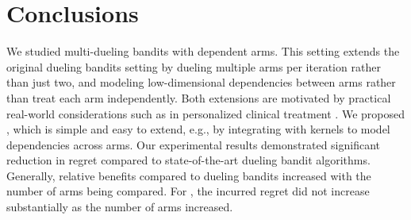 \section{Conclusions}



We studied multi-dueling bandits with dependent arms.  This setting extends the original dueling bandits setting by dueling multiple arms per iteration rather than just two, and modeling low-dimensional dependencies between arms rather than treat each arm independently.  Both extensions are motivated by practical real-world considerations such as in personalized clinical treatment \citep{sui2014clinical}.
We proposed \selfsparring, which is simple and easy to extend, e.g., by integrating with kernels to model dependencies across arms.  
Our experimental results demonstrated significant reduction in regret compared to state-of-the-art dueling bandit algorithms. Generally, relative benefits compared to dueling bandits increased with the number of arms being compared. For \selfsparring, the incurred regret did not increase substantially as the number of arms increased.

